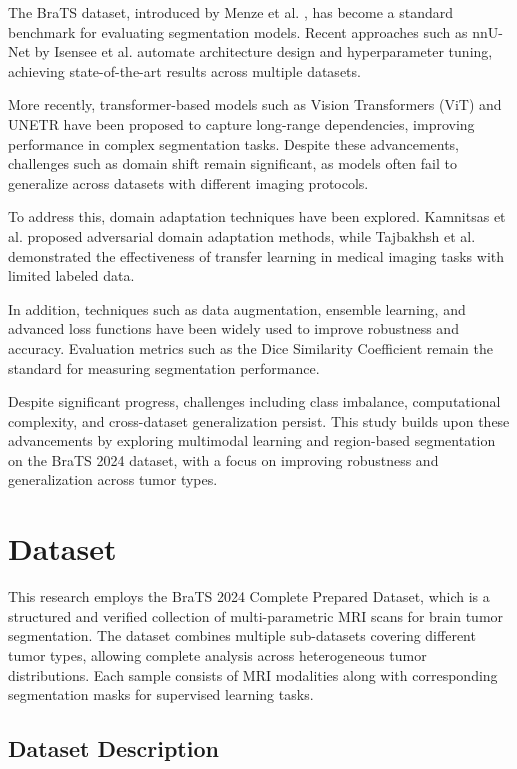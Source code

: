 \documentclass[conference]{IEEEtran}
\begin{document}
The BraTS dataset, introduced by Menze et al. \cite{5}, has become a standard benchmark for evaluating segmentation models. Recent approaches such as nnU-Net by Isensee et al. \cite{6} automate architecture design and hyperparameter tuning, achieving state-of-the-art results across multiple datasets.

More recently, transformer-based models such as Vision Transformers (ViT) \cite{7} and UNETR \cite{8} have been proposed to capture long-range dependencies, improving performance in complex segmentation tasks. Despite these advancements, challenges such as domain shift remain significant, as models often fail to generalize across datasets with different imaging protocols.

To address this, domain adaptation techniques have been explored. Kamnitsas et al. \cite{9} proposed adversarial domain adaptation methods, while Tajbakhsh et al. \cite{10} demonstrated the effectiveness of transfer learning in medical imaging tasks with limited labeled data.

In addition, techniques such as data augmentation, ensemble learning, and advanced loss functions have been widely used to improve robustness and accuracy. Evaluation metrics such as the Dice Similarity Coefficient remain the standard for measuring segmentation performance.

Despite significant progress, challenges including class imbalance, computational complexity, and cross-dataset generalization persist. This study builds upon these advancements by exploring multimodal learning and region-based segmentation on the BraTS 2024 dataset, with a focus on improving robustness and generalization across tumor types.


\section{Dataset}

This research employs the BraTS 2024 Complete Prepared Dataset, which is a structured and verified collection of multi-parametric MRI scans for brain tumor segmentation. The dataset combines multiple sub-datasets covering different tumor types, allowing complete analysis across heterogeneous tumor distributions. Each sample consists of MRI modalities along with corresponding segmentation masks for supervised learning tasks.

\subsection{Dataset Description}
\end{document}
